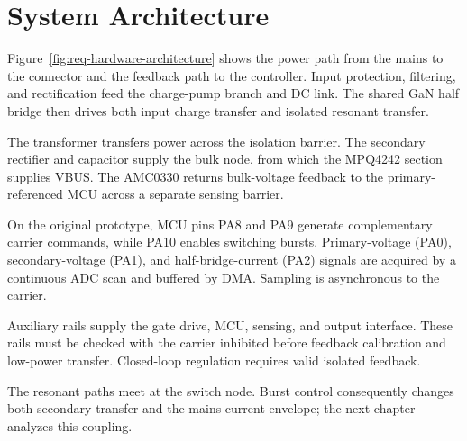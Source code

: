 \section{System Architecture}
\label{sec:req-architecture}

Figure~\ref{fig:req-hardware-architecture} shows the power path from the mains to the connector and the feedback path to the controller. Input protection, filtering, and rectification feed the charge-pump branch and DC link. The shared GaN half bridge then drives both input charge transfer and isolated resonant transfer.



The transformer transfers power across the isolation barrier. The secondary rectifier and capacitor supply the bulk node, from which the MPQ4242 section supplies VBUS. The AMC0330 returns bulk-voltage feedback to the primary-referenced MCU across a separate sensing barrier.

On the original prototype, MCU pins PA8 and PA9 generate complementary carrier commands, while PA10 enables switching bursts. Primary-voltage (PA0), secondary-voltage (PA1), and half-bridge-current (PA2) signals are acquired by a continuous ADC scan and buffered by DMA. Sampling is asynchronous to the carrier.

Auxiliary rails supply the gate drive, MCU, sensing, and output interface. These rails must be checked with the carrier inhibited before feedback calibration and low-power transfer. Closed-loop regulation requires valid isolated feedback.

The resonant paths meet at the switch node. Burst control consequently changes both secondary transfer and the mains-current envelope; the next chapter analyzes this coupling.

